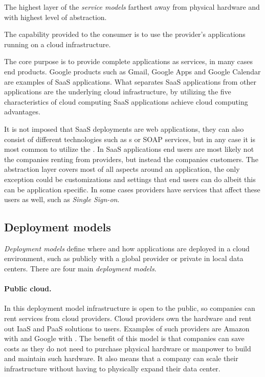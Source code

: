 The highest layer of the \emph{service models} farthest away from physical hardware
and with highest level of abstraction.
\epigraph{The capability provided to the consumer is to use the provider's 
  applications running on a cloud infrastructure.
}{}

The core purpose is to provide complete applications as services, in many cases end products.
Google products such as Gmail, Google Apps and  Google Calendar are examples of 
SaaS applications.
What separates SaaS applications from other applications are the underlying cloud infrastructure,
by utilizing the five characteristics of cloud computing SaaS applications achieve 
cloud computing advantages.

It is not imposed that SaaS deployments are web applications, they can also consist of
different technologies such as  s or SOAP services, but in any case it is 
most common to utilize the .
In SaaS applications end users are most likely not the companies renting from providers, 
but instead the companies customers.
The abstraction layer covers most of all aspects around an application,
the only exception could be customizations and settings that end users can do albeit 
this can be application specific. In some cases providers have services that affect
these users as well, such as \emph{Single Sign-on}.

\subsection{Deployment models}

\emph{Deployment models} define where and how applications are deployed in a cloud environment,
such as publicly with a global provider or private in local data centers.
There are four main \emph{deployment models}.

\paragraph{Public cloud.}

In this deployment model infrastructure is open to the public,
so companies can rent services from cloud providers.
Cloud providers own the hardware and rent out IaaS and PaaS solutions to users.
Examples of such providers are Amazon with  and Google with .
The benefit of this model is that companies can save costs as 
they do not need to purchase physical hardware or manpower to build and maintain such hardware.
It also means that a company can scale their infrastructure without having to
physically expand their data center.

